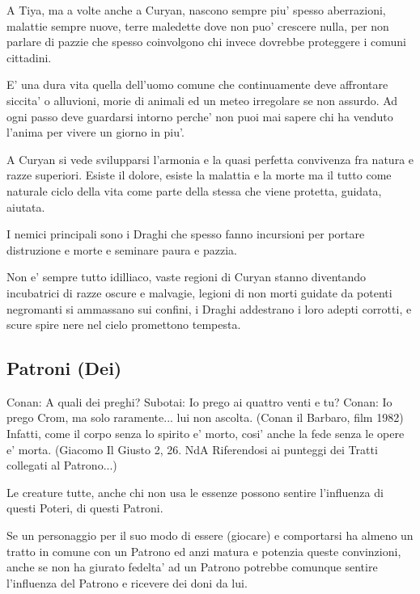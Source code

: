 \documentclass[a4paper,11pt,twoside,openany]{dndbook}
\begin{document}
{A Tiya, ma a volte anche a Curyan, nascono sempre piu' spesso aberrazioni, malattie sempre nuove, terre maledette dove non puo' crescere nulla, per non parlare di pazzie che spesso coinvolgono chi invece dovrebbe proteggere i comuni cittadini.

E' una dura vita quella dell'uomo comune che continuamente deve affrontare siccita' o alluvioni, morie di animali ed un meteo irregolare se non assurdo. Ad ogni passo deve guardarsi intorno perche' non puoi mai sapere chi ha venduto l'anima per vivere un giorno in piu'.

A Curyan si vede svilupparsi l'armonia e la quasi perfetta convivenza fra natura e razze superiori. Esiste il dolore, esiste la malattia e la morte ma il tutto come naturale ciclo della vita come parte della stessa che viene protetta, guidata, aiutata.

I nemici principali sono i Draghi che spesso fanno incursioni per portare distruzione e morte e seminare paura e pazzia.

Non e' sempre tutto idilliaco, vaste regioni di Curyan stanno diventando incubatrici di razze oscure e malvagie, legioni di non morti guidate da potenti negromanti si ammassano sui confini, i Draghi addestrano i loro adepti corrotti, e scure spire nere nel cielo promettono tempesta.

\pagebreak

\subsection{Patroni (Dei)}

\label{patroni-dei}
\begin{quotebox}
Conan: A quali dei preghi?\linebreak
Subotai: Io prego ai quattro venti e tu?\linebreak
Conan: Io prego Crom, ma solo raramente... lui non ascolta. (Conan il Barbaro, film 1982)\linebreak\linebreak
Infatti, come il corpo senza lo spirito e' morto, cosi' anche la fede senza le opere e' morta. (Giacomo Il Giusto 2, 26. NdA Riferendosi ai punteggi dei Tratti collegati al Patrono...)\end{quotebox}

Le creature tutte, anche chi non usa le essenze possono sentire l'influenza di questi Poteri, di questi Patroni.

Se un personaggio per il suo modo di essere (giocare) e comportarsi ha almeno un tratto in comune con un Patrono ed anzi matura e potenzia queste convinzioni, anche se non ha giurato fedelta' ad un Patrono potrebbe comunque sentire l'influenza del Patrono e ricevere dei doni da lui.

}
\end{document}
